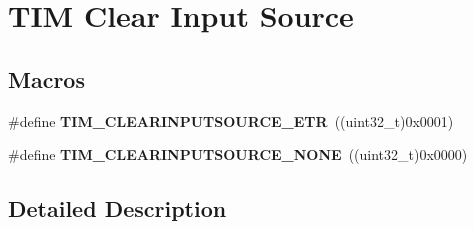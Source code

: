 \hypertarget{group___t_i_m___clear_input___source}{}\section{T\+IM Clear Input Source}
\label{group___t_i_m___clear_input___source}
\subsection*{Macros}
\begin{DoxyCompactItemize}
\item 
\#define {\bfseries T\+I\+M\+\_\+\+C\+L\+E\+A\+R\+I\+N\+P\+U\+T\+S\+O\+U\+R\+C\+E\+\_\+\+E\+TR}~((uint32\+\_\+t)0x0001)\hypertarget{group___t_i_m___clear_input___source_gaa28a8cf1db85cf6c845c6c1f02ba5c8e}{}\label{group___t_i_m___clear_input___source_gaa28a8cf1db85cf6c845c6c1f02ba5c8e}

\item 
\#define {\bfseries T\+I\+M\+\_\+\+C\+L\+E\+A\+R\+I\+N\+P\+U\+T\+S\+O\+U\+R\+C\+E\+\_\+\+N\+O\+NE}~((uint32\+\_\+t)0x0000)\hypertarget{group___t_i_m___clear_input___source_ga48c5312aecd377fab00d62e9b4169e9e}{}\label{group___t_i_m___clear_input___source_ga48c5312aecd377fab00d62e9b4169e9e}

\end{DoxyCompactItemize}


\subsection{Detailed Description}
